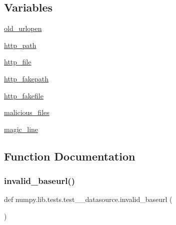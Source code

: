 \subsection*{Variables}
\begin{DoxyCompactItemize}
\item 
\hyperlink{namespacenumpy_1_1lib_1_1tests_1_1test____datasource_aeaff04b425d917b0f37e4183670810f8}{old\+\_\+urlopen}
\item 
\hyperlink{namespacenumpy_1_1lib_1_1tests_1_1test____datasource_a2e935c33c91d2b574e17a42ba810a4b9}{http\+\_\+path}
\item 
\hyperlink{namespacenumpy_1_1lib_1_1tests_1_1test____datasource_a6528ad4abda0166fd15e9825d8eba2ba}{http\+\_\+file}
\item 
\hyperlink{namespacenumpy_1_1lib_1_1tests_1_1test____datasource_a80da8a9e6104121309e9aa3ba7338f13}{http\+\_\+fakepath}
\item 
\hyperlink{namespacenumpy_1_1lib_1_1tests_1_1test____datasource_a22396319dd220b330fe67dc6920aa614}{http\+\_\+fakefile}
\item 
\hyperlink{namespacenumpy_1_1lib_1_1tests_1_1test____datasource_a1f0a819ec516338a1a59f4c35137e97e}{malicious\+\_\+files}
\item 
\hyperlink{namespacenumpy_1_1lib_1_1tests_1_1test____datasource_a5246bc1ca6aba20bda7dd77b3cf106e5}{magic\+\_\+line}
\end{DoxyCompactItemize}


\subsection{Function Documentation}
\mbox{\label{namespacenumpy_1_1lib_1_1tests_1_1test____datasource_ab145ea4eeb57a2c52c4de5070b1c82d2}} 
\subsubsection{\texorpdfstring{invalid\+\_\+baseurl()}{invalid\_baseurl()}}
{\footnotesize\ttfamily def numpy.\+lib.\+tests.\+test\+\_\+\+\_\+datasource.\+invalid\+\_\+baseurl (\begin{DoxyParamCaption}{ }\end{DoxyParamCaption})}

